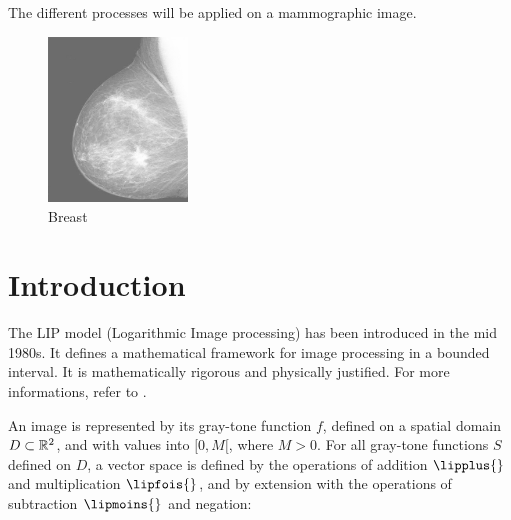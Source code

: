 
\begin{note}\end{note}


\noindent The different processes will be applied on a mammographic image.
\vspace*{-5pt}
\begin{figure}[htbp]
\begin{center}
\includegraphics[width=3.7cm]{breast.jpg}
\caption{Breast}
\vspace*{-8pt}
\end{center}
\end{figure}

\vspace*{-14pt}
\section{Introduction}
\vspace*{-6pt}
The LIP model (Logarithmic Image processing) has been introduced in the mid 1980s. It defines a mathematical framework for image processing in a bounded interval.  It is mathematically rigorous and physically justified. For more informations, refer to \cite{Pinoli1987,Jourlin1987,Pinoli1997}. 

An image is represented by its gray-tone function $f$, defined on a spatial domain  $D\subset\mathbb{R}^2$, and with values into $[0,M[$, where $M>0$. For all gray-tone functions $S$ defined on  $D$, a vector space is defined by the operations of addition $\lipplus{}$ and multiplication $\lipfois{}$, and by extension with  the operations of subtraction $\lipmoins{}$ and negation:\vspace*{-10pt}

